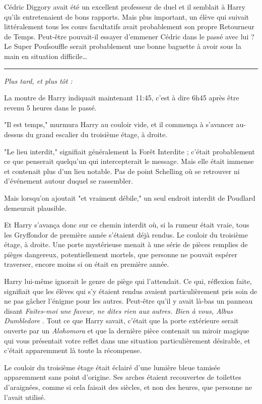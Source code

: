 Cédric Diggory avait été un excellent professeur de duel et il semblait à Harry qu'ils entretenaient de bons rapports. Mais plus important, un élève qui suivait littéralement tous les cours facultatifs avait probablement son propre Retourneur de Temps. Peut-être pouvait-il essayer d'emmener Cédric dans le passé avec lui ? Le Super Poufsouffle serait probablement une bonne baguette à avoir sous la main en situation difficile…
\par\noindent\rule{\textwidth}{0.4pt}
\emph{Plus tard, et plus tôt :} 

La montre de Harry indiquait maintenant 11:45, c'est à dire 6h45 après être revenu 5 heures dans le passé.

"Il est temps," murmura Harry au couloir vide, et il commença à s'avancer au-dessus du grand escalier du troisième étage, à droite.

"Le lieu interdit," signifiait généralement la Forêt Interdite ; c'était probablement ce que penserait quelqu'un qui intercepterait le message. Mais elle était immense et contenait plus d'un lieu notable. Pas de point Schelling où se retrouver ni d'événement autour duquel se rassembler.

Mais lorsqu'on ajoutait "et vraiment débile," un seul endroit interdit de Poudlard demeurait plausible.

Et Harry s'avança donc sur ce chemin interdit où, si la rumeur était vraie, tous les Gryffondor de première année s'étaient déjà rendus. Le couloir du troisième étage, à droite. Une porte mystérieuse menait à une série de pièces remplies de pièges dangereux, potentiellement mortels, que personne ne pouvait espérer traverser, encore moins si on était en première année.

Harry lui-même ignorait le genre de piège qui l'attendait. Ce qui, réflexion faite, signifiait que les élèves qui s'y étaient rendus avaient particulièrement pris soin de ne pas gâcher l'énigme pour les autres. Peut-être qu'il y avait là-bas un panneau disant \emph{Faites-moi une faveur, ne dites rien aux autres. Bien à vous, Albus Dumbledore} . Tout ce que Harry savait, c'était que la porte extérieure serait ouverte par un \emph{Alohomora}  et que la dernière pièce contenait un miroir magique qui vous présentait votre reflet dans une situation particulièrement désirable, et c'était apparemment là toute la récompense.

Le couloir du troisième étage était éclairé d'une lumière bleue tamisée apparemment sans point d'origine. Ses arches étaient recouvertes de toilettes d'araignées, comme si cela faisait des siècles, et non des heures, que personne ne l'avait utilisé.

